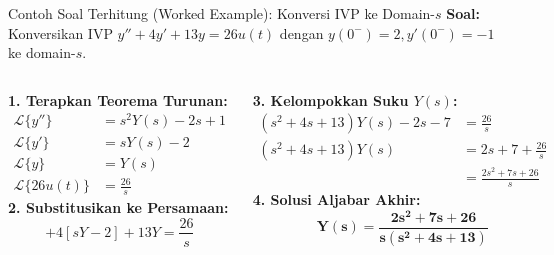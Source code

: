 \documentclass[aspectratio=169,10pt]{beamer}
\begin{document}
\begin{frame}{Contoh Soal Terhitung (Worked Example): Konversi IVP ke Domain-$s$}
  \textbf{Soal:} Konversikan IVP $y'' + 4y' + 13y = 26 u(t)$ dengan $y(0^-) = 2, y'(0^-) = -1$ ke domain-$s$.
  \vspace{0.15cm}

  \begin{columns}[t]
    \textbf{1. Terapkan Teorema Turunan:}
    \begin{align*}
      \mathcal{L}\{y''\} &= s^2 Y(s) - 2s + 1 \\
      \mathcal{L}\{y'\}  &= s Y(s) - 2 \\
      \mathcal{L}\{y\}   &= Y(s) \\
      \mathcal{L}\{26 u(t)\} &= \frac{26}{s}
    \end{align*}
    \textbf{2. Substitusikan ke Persamaan:}
    \begin{equation*}
      [s^2 Y - 2s + 1] + 4[s Y - 2] + 13 Y = \frac{26}{s}
    \end{equation*}

    \textbf{3. Kelompokkan Suku $Y(s)$:}
    \begin{align*}
      (s^2 + 4s + 13) Y(s) - 2s - 7 &= \frac{26}{s} \\
      (s^2 + 4s + 13) Y(s) &= 2s + 7 + \frac{26}{s} \\
                           &= \frac{2s^2 + 7s + 26}{s}
    \end{align*}
    \textbf{4. Solusi Aljabar Akhir:}
    \begin{equation*}
      \mathbf{Y(s) = \frac{2s^2 + 7s + 26}{s(s^2 + 4s + 13)}}
    \end{equation*}
  \end{columns}
\end{frame}
\end{document}
